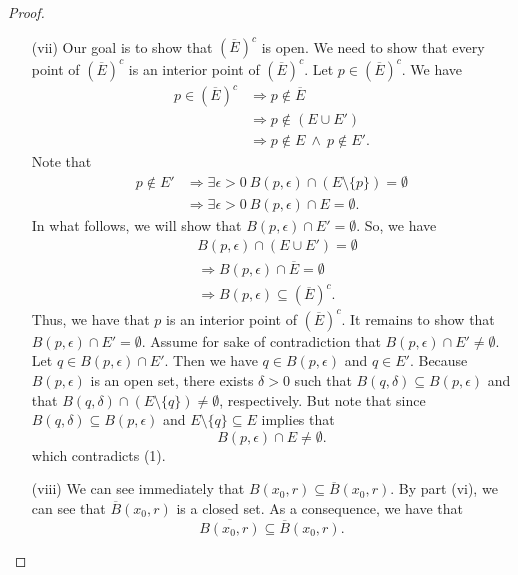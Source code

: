 \documentclass[a4paper]{article}
\begin{document}
\begin{proof}
\begin{enumerate}
    \item[(vii)] Our goal is to show that \( (\overline{E})^{c} \) is open. We need to show that every point of \( (\overline{E})^{c} \) is an interior point of \( (\overline{E})^{c} \). Let \( p \in (\overline{E})^{c} \). We have 
\begin{align*}
    p \in (\overline{E})^{c} &\Longrightarrow p \notin \overline{E} \\ 
                             &\Longrightarrow p \notin (E \cup E') \\
                             &\Longrightarrow p \notin E \ \wedge \ p \notin E'.
\end{align*}
Note that 
\begin{align*}
    p \notin E' &\Longrightarrow \exists \epsilon > 0 \  B(p,\epsilon) \cap (E \setminus \{ p \} ) = \emptyset \\
                &\Longrightarrow \exists \epsilon > 0 \  B(p,\epsilon) \cap E = \emptyset. \tag{1}
\end{align*}
In what follows, we will show that \(  B(p,\epsilon) \cap E' = \emptyset \). So, we have
\begin{align*}
    &B(p,\epsilon) \cap (E \cup E') = \emptyset \\
                                       &\Longrightarrow  B(p,\epsilon)\cap \overline{E} = \emptyset \\
                                       &\Longrightarrow  B(p,\epsilon)\subseteq (\overline{E})^{c}.
\end{align*}
Thus, we have that \( p  \) is an interior point of \( (\overline{E})^{c}\). It remains to show that \( B(p,\epsilon) \cap E'  = \emptyset\). Assume for sake of contradiction that \(  B(p,\epsilon) \cap E' \neq \emptyset \). Let \( q \in B(p,\epsilon) \cap E' \). Then we have \( q \in B(p,\epsilon)  \) and \( q \in E' \). Because \( B(p,\epsilon) \) is an open set, there exists \( \delta > 0  \) such that \( B(q,\delta) \subseteq B(p,\epsilon) \) and that \(  B(q,\delta) \cap (E \setminus  \{ q \} ) \neq \emptyset \), respectively. But note that since \(  B(q,\delta) \subseteq B(p,\epsilon)  \) and \( E \setminus  \{ q  \} \subseteq E   \) implies that 
\[  B(p,\epsilon) \cap E \neq \emptyset. \]
which contradicts (1).
    \item[(viii)] We can see immediately that \( B({x}_{0}, r) \subseteq \overline{B}({x}_{0} ,r)    \). By part (vi), we can see that \( \overline{B}({x}_{0},r) \) is a closed set. As a consequence, we have that 
        \[  \overline{B({x}_{0},r)} \subseteq  \overline{B}({x}_{0},r). \]


\end{enumerate}
\end{proof}
\end{document}
